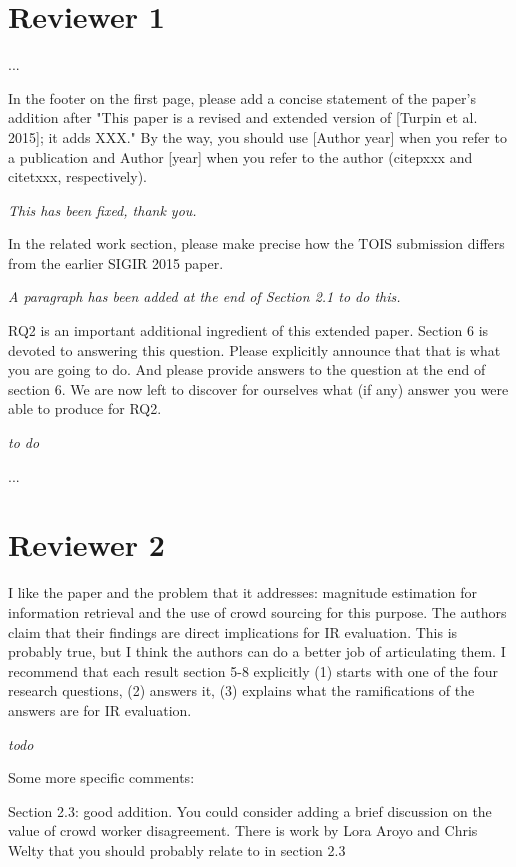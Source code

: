 \documentclass{article}
\newcommand{\comment}[1]{\vspace{1em} \emph{#1} \vspace{1em}}
\begin{document}
\section{Reviewer 1}

...

In the footer on the first page, please add a concise statement of
the paper's addition after "This paper is a revised and extended
version of [Turpin et al. 2015]; it adds XXX." By the way, you
should use [Author year] when you refer to a publication and Author
[year] when you refer to the author (citep{xxx} and citet{xxx},
respectively).

\comment{This has been fixed, thank you.}

In the related work section, please make precise how the TOIS
submission differs from the earlier SIGIR 2015 paper.

\comment{A paragraph has been added at the end of Section 2.1 to do this.}

RQ2 is an important additional ingredient of this extended paper.
Section 6 is devoted to answering this question. Please explicitly
announce that that is what you are going to do. And please provide
answers to the question at the end of section 6. We are now left
to discover for ourselves what (if any) answer you were able to
produce for RQ2.

\comment{to do }

\noindent ...


\section{Reviewer 2}

I like the paper and the problem that it addresses: magnitude
estimation for information retrieval and the use of crowd sourcing
for this purpose. The authors claim that their findings are direct
implications for IR evaluation. This is probably true, but I think
the authors can do a better job of articulating them. I recommend
that each result section 5-8 explicitly (1) starts with one of the
four research questions, (2) answers it, (3) explains what the
ramifications of the answers are for IR evaluation.

\comment {todo}

Some more specific comments:

Section 2.3: good addition. You could consider adding a brief
discussion on the value of crowd worker disagreement. There is work
by Lora Aroyo and Chris Welty that you should probably relate to
in section 2.3
\end{document}
